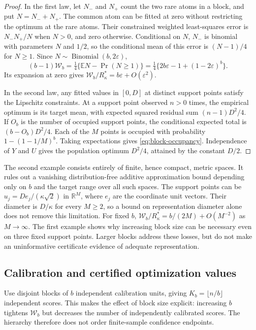 \begin{proof}
In the first law, let $N_-$ and $N_+$ count the two rare atoms in
a block, and put $N=N_-+N_+$. The common atom can be fitted at zero
without restricting the optimum at the rare atoms. Their constrained
weighted least-squares error is $N_-N_+/N$ when $N>0$, and zero
otherwise. Conditional on $N$, $N_-$ is binomial with parameters
$N$ and $1/2$, so the conditional mean of this error is
$(N-1)/4$ for $N\geq1$. Since
$N\sim\operatorname{Binomial}(b,2\varepsilon)$,
\[
 (b-1)\mathcal{W}_b=\tfrac14\{\mathbb EN-\Pr(N\geq1)\}
 =\tfrac14\{2b\varepsilon-1+(1-2\varepsilon)^b\}.
\]
Its expansion at zero gives
$\mathcal{W}_b/R^*_\kappa=b\varepsilon+O(\varepsilon^2)$.

In the second law, any fitted values in $[0,D]$ at distinct support
points satisfy the Lipschitz constraints. At a support point observed
$n>0$ times, the empirical optimum is its target mean, with expected
squared residual sum $(n-1)D^2/4$. If $O_b$ is the number of occupied
support points, the conditional expected total is
$(b-O_b)D^2/4$. Each of the $M$ points is occupied with probability
$1-(1-1/M)^b$. Taking expectations gives
\eqref{eq:block-occupancy}. Independence of $Y$ and $U$ gives the
population optimum $D^2/4$, attained by the constant $D/2$.
\end{proof}

The second example consists entirely of finite, hence compact, metric
spaces. It rules out a vanishing distribution-free additive approximation bound
depending only on $b$ and the target range over all such spaces. The
support points can be $u_j=D e_j/(\kappa\sqrt2)$ in $\mathbb R^M$,
where $e_j$ are the coordinate unit vectors. Their diameter is
$D/\kappa$ for every $M\geq2$, so a bound on representation diameter
alone does not remove this limitation. For fixed $b$,
$\mathcal{W}_b/R^*_\kappa=b/(2M)+O(M^{-2})$ as $M\to\infty$.
The
first example shows why increasing block size can be necessary even on
three fixed support points. Larger blocks address these losses, but do
not make an uninformative certificate evidence of adequate representation.

\subsection{Calibration and certified optimization values}

Use disjoint blocks of $b$ independent calibration units, giving
$K_b=\lfloor n/b\rfloor$ independent scores. This makes the effect of
block size explicit: increasing $b$ tightens $\mathcal{W}_b$ but decreases the
number of independently calibrated scores. The hierarchy therefore
does not order finite-sample confidence endpoints.

